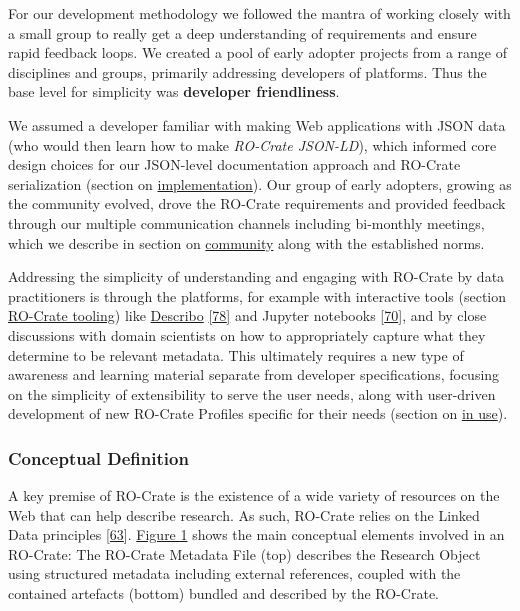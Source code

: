For our development methodology we followed the mantra of working
closely with a small group to really get a deep understanding of
requirements and ensure rapid feedback loops. We created a pool of early
adopter projects from a range of disciplines and groups, primarily
addressing developers of platforms. Thus the base level for simplicity
was \textbf{developer friendliness}.

We assumed a developer familiar with making Web applications with JSON
data (who would then learn how to make \emph{RO-Crate JSON-LD}), which
informed core design choices for our JSON-level documentation approach
and RO-Crate serialization (section on
\protect\hyperlink{implementation}{implementation}). Our group of early
adopters, growing as the community evolved, drove the RO-Crate
requirements and provided feedback through our multiple communication
channels including bi-monthly meetings, which we describe in section on
\protect\hyperlink{community}{community} along with the established
norms.

Addressing the simplicity of understanding and engaging with RO-Crate by
data practitioners is through the platforms, for example with
interactive tools (section \protect\hyperlink{tooling}{RO-Crate
tooling}) like
\href{https://arkisto-platform.github.io/describo/}{Describo}
\href{https://arkisto-platform.github.io/describo/}{{[}78{]}} and
Jupyter notebooks
{[}\href{https://doi.org/10.3233/978-1-61499-649-1-87}{70}{]}, and by
close discussions with domain scientists on how to appropriately capture
what they determine to be relevant metadata. This ultimately requires a
new type of awareness and learning material separate from developer
specifications, focusing on the simplicity of extensibility to serve the
user needs, along with user-driven development of new RO-Crate Profiles
specific for their needs (section on \protect\hyperlink{inuse}{in use}).

\hypertarget{conceptual}{%
\subsubsection{Conceptual Definition}\label{conceptual}}

A key premise of RO-Crate is the existence of a wide variety of
resources on the Web that can help describe research. As such, RO-Crate
relies on the Linked Data principles
{[}\href{https://doi.org/10.2200/S00334ED1V01Y201102WBE001}{63}{]}.
\protect\hyperlink{fig:conceptual}{Figure 1} shows the main conceptual
elements involved in an RO-Crate: The RO-Crate Metadata File (top)
describes the Research Object using structured metadata including
external references, coupled with the contained artefacts (bottom)
bundled and described by the RO-Crate.

